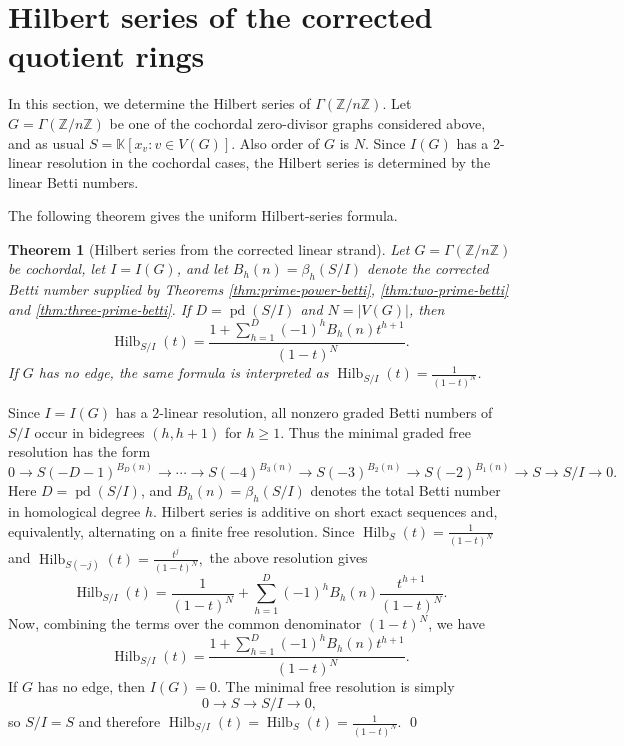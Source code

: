 \documentclass[12pt]{article}
\newtheorem{theorem}{Theorem}[section]
\theoremstyle{definition}
\renewenvironment{proof}{{\bf \noindent Proof.}}{\qed}
\begin{document}
 

\medskip

\section{Hilbert series of the corrected quotient rings}\label{sec:hilbert-series}

 In this section, we determine the Hilbert series of $\Gamma(\mathbb{Z}/n\mathbb{Z}).$ Let $G=\Gamma(\mathbb{Z}/n\mathbb{Z})$ be one of the cochordal zero-divisor graphs considered above, and as usual $S=\mathbb{K}[x_v:v\in V(G)]$.  Also order of $G$ is $N$.  Since $I(G)$ has a $2$-linear resolution in the cochordal cases, the Hilbert series is determined by the linear Betti numbers.

\medskip

\noindent The following theorem gives the uniform Hilbert-series formula.
\begin{theorem}[Hilbert series from the corrected linear strand]\label{thm:hilbert-uniform}
Let $G=\Gamma(\mathbb{Z}/n\mathbb{Z})$ be cochordal, let $I=I(G)$, and let $B_h(n)=\beta_h(S/I)$ denote the corrected Betti number supplied by Theorems \ref{thm:prime-power-betti}, \ref{thm:two-prime-betti} and \ref{thm:three-prime-betti}.  If $D=\operatorname{pd}(S/I)$ and $N=|V(G)|$, then
$$
\operatorname{Hilb}_{S/I}(t)=\frac{1+\sum_{h=1}^{D}(-1)^h B_h(n)t^{h+1}}{(1-t)^N}.
$$
If $G$ has no edge, the same formula is interpreted as $\operatorname{Hilb}_{S/I}(t)=\frac{1}{(1-t)^N}$.
\end{theorem}

\begin{proof}
	Since $I=I(G)$ has a $2$-linear resolution, all nonzero graded Betti numbers
	of $S/I$ occur in bidegrees $(h,h+1)$ for $h\geq 1$.  Thus the minimal graded
	free resolution has the form
	{\footnotesize$$
	0\longrightarrow S(-D-1)^{B_D(n)}
	\longrightarrow \cdots
	\longrightarrow S(-4)^{B_3(n)}
	\longrightarrow S(-3)^{B_2(n)}
	\longrightarrow S(-2)^{B_1(n)}
	\longrightarrow S
	\longrightarrow S/I
	\longrightarrow 0.
	$$}
	Here $D=\operatorname{pd}(S/I)$, and $B_h(n)=\beta_h(S/I)$ denotes the total Betti number in
	homological degree $h$. Hilbert series is additive on short exact sequences and, equivalently,
	alternating on a finite free resolution.  Since
	$ \operatorname{Hilb}_S(t)=\frac{1}{(1-t)^N}$
	and $
	\operatorname{Hilb}_{S(-j)}(t)=\frac{t^j}{(1-t)^N}, $
	the above resolution gives
	$$
	\operatorname{Hilb}_{S/I}(t)
	=
	\frac{1}{(1-t)^N}
	+
	\sum_{h=1}^{D}(-1)^h B_h(n)\frac{t^{h+1}}{(1-t)^N}.
	$$
	Now, combining the terms over the common denominator $(1-t)^N$, we have
	$$
	\operatorname{Hilb}_{S/I}(t)
	=
	\frac{1+\sum_{h=1}^{D}(-1)^hB_h(n)t^{h+1}}{(1-t)^N}.
	$$
	 If $G$ has no edge, then $I(G)=0$.  The minimal free resolution is simply
	$$
	0\longrightarrow S\longrightarrow S/I\longrightarrow 0,
	$$
	so $S/I=S$ and therefore $
	\operatorname{Hilb}_{S/I}(t)=\operatorname{Hilb}_S(t)=\frac{1}{(1-t)^N}. $
\end{proof}
\medskip
\end{document}
